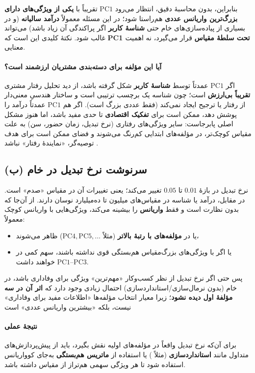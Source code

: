 \documentclass[12pt]{report}
\begin{document}
بنابراین، بدون محاسبهٔ دقیق، انتظار می‌رود $\text{PC1}$ تقریباً با \textbf{یکی از ویژگی‌های دارای بزرگ‌ترین واریانس عددی} هم‌راستا شود؛ در این مسئله معمولاً \textbf{درآمد سالیانه} (و در بسیاری از پیاده‌سازی‌های خام حتی \textbf{شناسهٔ کاربر} اگر پراکندگی آن زیاد باشد) می‌تواند غالب شود. نکتهٔ کلیدی این است که \textbf{PC1 تحت سلطهٔ مقیاس} قرار می‌گیرد، نه اهمیت معنایی.

\paragraph{آیا این مؤلفه برای دسته‌بندی مشتریان ارزشمند است؟}
اگر $\text{PC1}$ عمدتاً توسط \textbf{شناسهٔ کاربر} شکل گرفته باشد، از دید تحلیل رفتار مشتری \textbf{تقریباً بی‌ارزش} است؛ چون شناسه یک برچسب ترتیبی است و ساختار هندسیِ معنی‌دار از رفتار یا ترجیح ایجاد نمی‌کند (فقط عددی بزرگ است). اگر هم $\text{PC1}$ عمدتاً درآمد را پوشش دهد، ممکن است برای \textbf{تفکیک اقتصادی} تا حدی مفید باشد، اما هنوز مشکل اصلی پابرجاست: سایر ویژگی‌های رفتاری (نرخ تبدیل، زمان حضور، سن) به علت مقیاس کوچک‌تر، در مؤلفه‌های ابتدایی کم‌رنگ می‌شوند و فضای  ممکن است برای هدف توصیه‌گر، «نمایندهٔ رفتار» نباشد \cite{Jolliffe}.

\subsection*{(ب) سرنوشت نرخ تبدیل در  خام}
نرخ تبدیل در بازهٔ $0.01$ تا $0.05$ تغییر می‌کند؛ یعنی تغییرات آن در مقیاس «صدم» است. در مقابل، درآمد یا شناسه در مقیاس‌های میلیون تا ده‌میلیارد نوسان دارند. از آن‌جا که  بدون نظارت است و فقط \textbf{واریانس} را بیشینه می‌کند، ویژگی‌هایی با واریانس کوچک معمولاً:
\begin{itemize}
\item یا در \textbf{مؤلفه‌های با رتبهٔ بالاتر} (مثلاً $\text{PC4},\text{PC5},\dots$) ظاهر می‌شوند،
\item یا اگر با ویژگی‌های بزرگ‌مقیاس هم‌بستگی قوی نداشته باشند، سهم کمی در $\text{PC1--PC3}$ خواهند داشت.
\end{itemize}

پس حتی اگر نرخ تبدیل از نظر کسب‌وکار «مهم‌ترین» ویژگی برای وفاداری باشد، در  خام (بدون نرمال‌سازی/استانداردسازی) احتمال زیادی وجود دارد که \textbf{اثر آن در سه مؤلفهٔ اول دیده نشود}؛ زیرا معیار انتخاب مؤلفه‌ها «اطلاعات مفید برای وفاداری» نیست، بلکه «بیشترین واریانس عددی» است

\paragraph{نتیجهٔ عملی}
برای آن‌که نرخ تبدیل واقعاً در مؤلفه‌های اولیه نقش بگیرد، باید از پیش‌پردازش‌های متداول مانند \textbf{استانداردسازی} (مثلاً ) یا استفاده از \textbf{ماتریس هم‌بستگی} به‌جای کوواریانس استفاده شود تا هر ویژگی سهمی هم‌تراز از مقیاس داشته باشد.
\end{document}
